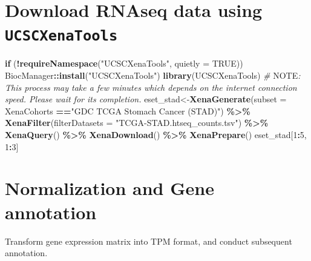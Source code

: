 \documentclass[
  12pt,
]{book}
\newenvironment{Shaded}{\begin{snugshade}}{\end{snugshade}}
\newcommand{\AlertTok}[1]{\textcolor[rgb]{0.94,0.16,0.16}{#1}}
\newcommand{\AttributeTok}[1]{\textcolor[rgb]{0.13,0.29,0.53}{#1}}
\newcommand{\CommentTok}[1]{\textcolor[rgb]{0.56,0.35,0.01}{\textit{#1}}}
\newcommand{\ConstantTok}[1]{\textcolor[rgb]{0.56,0.35,0.01}{#1}}
\newcommand{\ControlFlowTok}[1]{\textcolor[rgb]{0.13,0.29,0.53}{\textbf{#1}}}
\newcommand{\DecValTok}[1]{\textcolor[rgb]{0.00,0.00,0.81}{#1}}
\newcommand{\FunctionTok}[1]{\textcolor[rgb]{0.13,0.29,0.53}{\textbf{#1}}}
\newcommand{\NormalTok}[1]{#1}
\newcommand{\OtherTok}[1]{\textcolor[rgb]{0.56,0.35,0.01}{#1}}
\newcommand{\SpecialCharTok}[1]{\textcolor[rgb]{0.81,0.36,0.00}{\textbf{#1}}}
\newcommand{\StringTok}[1]{\textcolor[rgb]{0.31,0.60,0.02}{#1}}
\begin{document}
\hypertarget{download-rnaseq-data-using-ucscxenatools}{%
\section{\texorpdfstring{Download RNAseq data using \texttt{UCSCXenaTools}}{Download RNAseq data using UCSCXenaTools}}\label{download-rnaseq-data-using-ucscxenatools}}

\begin{Shaded}
\begin{Highlighting}[]
\ControlFlowTok{if}\NormalTok{ (}\SpecialCharTok{!}\FunctionTok{requireNamespace}\NormalTok{(}\StringTok{"UCSCXenaTools"}\NormalTok{, }\AttributeTok{quietly =} \ConstantTok{TRUE}\NormalTok{))   BiocManager}\SpecialCharTok{::}\FunctionTok{install}\NormalTok{(}\StringTok{"UCSCXenaTools"}\NormalTok{)}
\FunctionTok{library}\NormalTok{(UCSCXenaTools)}
\CommentTok{\# }\AlertTok{NOTE}\CommentTok{: This process may take a few minutes which depends on the internet connection speed. Please wait for its completion.}
\NormalTok{eset\_stad}\OtherTok{\textless{}{-}}\FunctionTok{XenaGenerate}\NormalTok{(}\AttributeTok{subset =}\NormalTok{ XenaCohorts }\SpecialCharTok{==}\StringTok{"GDC TCGA Stomach Cancer (STAD)"}\NormalTok{) }\SpecialCharTok{\%\textgreater{}\%} 
  \FunctionTok{XenaFilter}\NormalTok{(}\AttributeTok{filterDatasets    =} \StringTok{"TCGA{-}STAD.htseq\_counts.tsv"}\NormalTok{) }\SpecialCharTok{\%\textgreater{}\%} 
  \FunctionTok{XenaQuery}\NormalTok{() }\SpecialCharTok{\%\textgreater{}\%}
  \FunctionTok{XenaDownload}\NormalTok{() }\SpecialCharTok{\%\textgreater{}\%} 
  \FunctionTok{XenaPrepare}\NormalTok{()}
\NormalTok{eset\_stad[}\DecValTok{1}\SpecialCharTok{:}\DecValTok{5}\NormalTok{, }\DecValTok{1}\SpecialCharTok{:}\DecValTok{3}\NormalTok{]}
\end{Highlighting}
\end{Shaded}

\hypertarget{normalization-and-gene-annotation}{%
\section{Normalization and Gene annotation}\label{normalization-and-gene-annotation}}

Transform gene expression matrix into TPM format, and conduct subsequent annotation.
\end{document}
